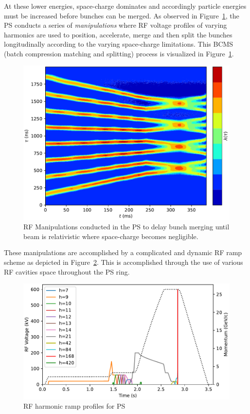 At these lower energies, space-charge dominates and accordingly particle energies must be increased before bunches can be merged. As observed in Figure~\ref{fig:bcms}, the PS conducts a series of \textit{manipulations} where RF voltage profiles of varying harmonics are used to position, accelerate, merge and then split the bunches longitudinally according to the varying space-charge limitations. This BCMS (batch compression matching and splitting) process is visualized in Figure~\ref{fig:bcms}.

\begin{figure}
    \centering
    \includegraphics{figs/allmanip.dat.pdf}
    \caption{RF Manipulations conducted in the PS to delay bunch merging until beam is relativistic where space-charge becomes negligible.}
    \label{fig:bcms}
\end{figure}

These manipulations are accomplished by a complicated and dynamic RF ramp scheme as depicted in Figure~\ref{fig:ps_ramp}. This is accomplished through the use of various RF cavities space throughout the PS ring.

\begin{figure}
    \centering
    \includegraphics{figs/ps_profiles.pdf}
    \caption{RF harmonic ramp profiles for PS}
    \label{fig:ps_ramp}
\end{figure}

